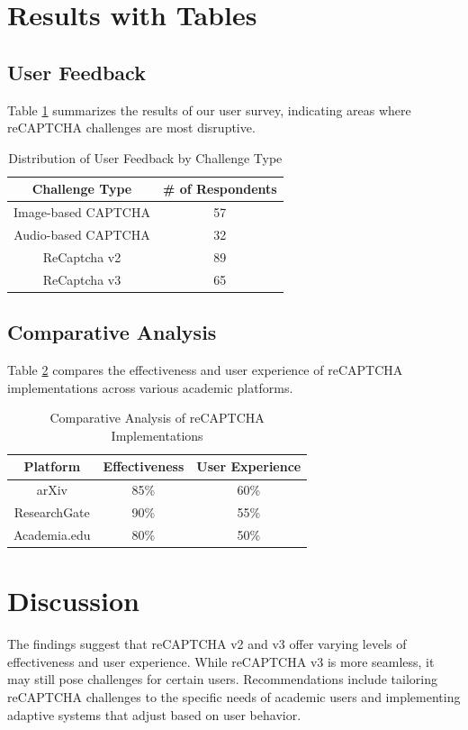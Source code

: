 \documentclass{article}
\begin{document}
\section{Results with Tables}
\subsection{User Feedback}
Table \ref{tab:userFeedback} summarizes the results of our user survey, indicating areas where reCAPTCHA challenges are most disruptive.

\begin{table}[htbp]
\centering
\begin{tabular}{|c|c|}
\hline
\textbf{Challenge Type} & \textbf{\# of Respondents} \\ \hline
Image-based CAPTCHA & 57 \\ \hline
Audio-based CAPTCHA & 32 \\ \hline
ReCaptcha v2 & 89 \\ \hline
ReCaptcha v3 & 65 \\ \hline
\end{tabular}
\caption{Distribution of User Feedback by Challenge Type}
\label{tab:userFeedback}
\end{table}

\subsection{Comparative Analysis}
Table \ref{tab:comparativeAnalysis} compares the effectiveness and user experience of reCAPTCHA implementations across various academic platforms.

\begin{table}[htbp]
\centering
\begin{tabular}{|c|c|c|}
\hline
\textbf{Platform} & \textbf{Effectiveness} & \textbf{User Experience} \\ \hline
arXiv & 85\% & 60\% \\ \hline
ResearchGate & 90\% & 55\% \\ \hline
Academia.edu & 80\% & 50\% \\ \hline
\end{tabular}
\caption{Comparative Analysis of reCAPTCHA Implementations}
\label{tab:comparativeAnalysis}
\end{table}

\section{Discussion}
The findings suggest that reCAPTCHA v2 and v3 offer varying levels of effectiveness and user experience. While reCAPTCHA v3 is more seamless, it may still pose challenges for certain users. Recommendations include tailoring reCAPTCHA challenges to the specific needs of academic users and implementing adaptive systems that adjust based on user behavior.
\end{document}
